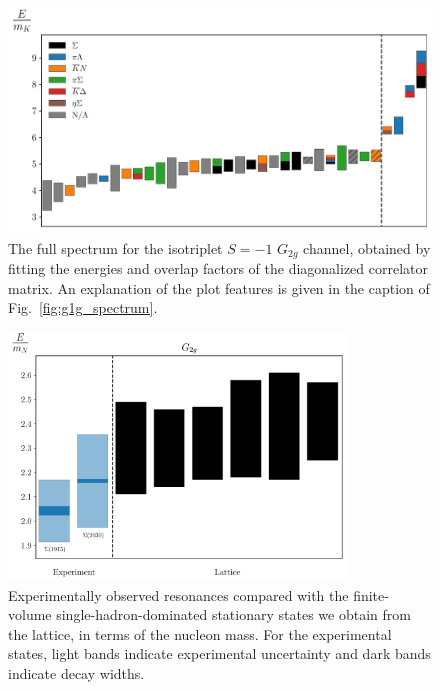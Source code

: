 \begin{figure}[H]
    \centering
    \hspace*{-0.5in}\includegraphics[width=\textwidth]{figures/sigmas/g2g/staircase_mk.pdf}
    \caption{The full spectrum for the isotriplet $S=-1$ $G_{2g}$ channel, obtained by fitting the energies and overlap factors of the diagonalized correlator matrix. An explanation of the plot features is given in the caption of Fig.~\ref{fig:g1g_spectrum}.}\label{fig:g2g_spectrum}
\end{figure}

\begin{figure}[H]
    \centering
    \includegraphics[width=0.8\textwidth]{figures/sigmas/g2g/expvslat.pdf}
    \caption{Experimentally observed resonances compared with the finite-volume single-hadron-dominated stationary states we obtain from the lattice, in terms of the nucleon mass. For the experimental states, light bands indicate experimental uncertainty and dark bands indicate decay widths.}\label{fig:g2g_exp}
\end{figure}

